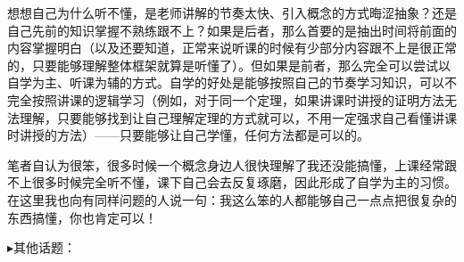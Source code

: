 \documentclass{ctexart}
\begin{document}
想想自己为什么听不懂，是老师讲解的节奏太快、引入概念的方式晦涩抽象？还是自己先前的知识掌握不熟练跟不上？如果是后者，那么首要的是抽出时间将前面的内容掌握明白（以及还要知道，正常来说听课的时候有少部分内容跟不上是很正常的，只要能够理解整体框架就算是听懂了）。但如果是前者，那么完全可以尝试以自学为主、听课为辅的方式。自学的好处是能够按照自己的节奏学习知识，可以不完全按照讲课的逻辑学习（例如，对于同一个定理，如果讲课时讲授的证明方法无法理解，只要能够找到让自己理解定理的方式就可以，不用一定强求自己看懂讲课时讲授的方法）——只要能够让自己学懂，任何方法都是可以的。

笔者自认为很笨，很多时候一个概念身边人很快理解了我还没能搞懂，上课经常跟不上很多时候完全听不懂，课下自己会去反复琢磨，因此形成了自学为主的习惯。在这里我也向有同样问题的人说一句：我这么笨的人都能够自己一点点把很复杂的东西搞懂，你也肯定可以！

\noindent$\blacktriangleright$\;其他话题：
\end{document}
